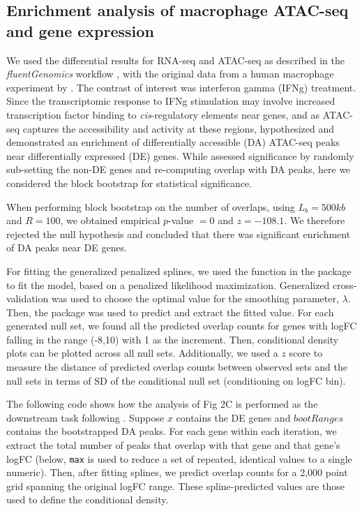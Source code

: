 \documentclass{article}
\begin{document}
\subsection{Enrichment analysis of macrophage ATAC-seq and gene expression}\label{sec:splines}

We used the differential results for RNA-seq and ATAC-seq as
described in the \textit{fluentGenomics} workflow \citep{lee2020fluent}, with
the original data from a human macrophage experiment by \citet{alasoo2018shared}.
The contrast of interest was interferon gamma (IFNg) treatment. Since the
transcriptomic response to IFNg stimulation may involve increased
transcription factor binding to \textit{cis}-regulatory elements near
genes, and as ATAC-seq captures the accessibility and activity at
these regions, \citet{lee2020fluent} hypothesized and demonstrated an
enrichment of differentially accessible (DA) ATAC-seq peaks near
differentially expressed (DE) genes. While \citet{lee2020fluent}
assessed significance by randomly sub-setting the non-DE genes and
re-computing overlap with DA peaks, here we considered the block
bootstrap for statistical significance.

When performing block bootstrap on the number of overlaps,
using $L_b = 500kb$ and $R = 100$,
we obtained empirical $\textit{p}$-value $=0$ and $z = -108.1$.
We therefore rejected the null hypothesis and concluded that there was
significant enrichment of DA peaks near DE genes.

For fitting the generalized penalized splines, we used the  function in
the  package \citep{mgcv2011wood} to fit the model, based on
a penalized likelihood maximization. Generalized cross-validation
was used to choose the optimal value for the smoothing parameter,
$\lambda$. Then, the  package was used to predict and
extract the fitted value. 
For each generated null set, we found all the predicted overlap counts
for genes with logFC falling in the range (-8,10) with 1 as the
increment. Then, conditional density plots can be plotted across all
null sets. Additionally, we used a $z$ score to measure the distance of
predicted overlap counts between observed sets and the null sets in
terms of SD of the conditional null set (conditioning on logFC bin).

The following code shows how the analysis of Fig 2C is performed as
the downstream task following \bootranges. Suppose $x$ contains the DE genes and
$bootRanges$ contains the bootstrapped DA peaks. For each gene within each
iteration, we extract the total number of peaks that overlap with that
gene and that gene's logFC
(below, \texttt{max} is used to reduce a set
of repeated, identical values to a single numeric).
Then, after fitting splines, we predict
overlap counts for a 2,000 point grid spanning the original logFC range.
These spline-predicted values are those used to define the conditional
density.
\end{document}
